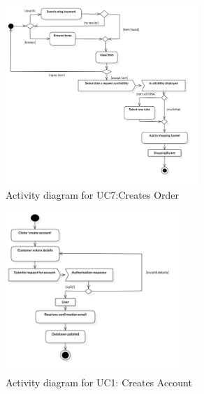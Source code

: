\documentclass[fontsize=11pt]{extarticle}
\numberwithin{figure}{section} %
\numberwithin{table}{section}%
\begin{document}
\begin{figure}[H]
      \centering
      \includegraphics[trim = 0 0 0 0, clip, width=0.65\textwidth]{TempImg/makeOrderAD.png}
      \caption{Activity diagram for UC7:Creates Order}
 \end{figure}

\begin{figure}[H]
      \centering
      \includegraphics[trim = 0 0 0 0, clip, width=0.6\textwidth]{TempImg/newUserAD.png}
      \caption{Activity diagram for UC1: Creates Account}
 \end{figure}
\end{document}
